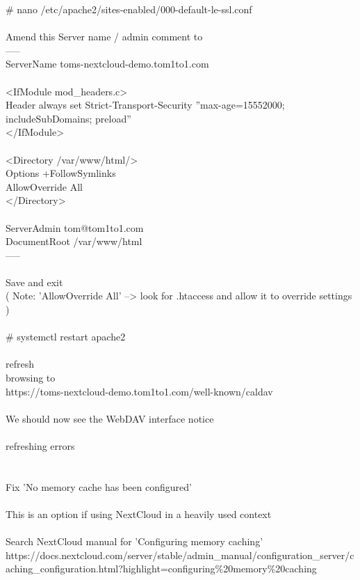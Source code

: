 \documentclass[10pt,a4paper]{article}
\begin{document}
{		\# nano /etc/apache2/sites-enabled/000-default-le-ssl.conf}{\large \\
		\\
		Amend this Server name / admin comment to\\
		-----\\
		ServerName toms-nextcloud-demo.tom1to1.com\\
\\
    		<IfModule mod\_headers.c>\\
      			Header always set Strict-Transport-Security ''max-age=15552000; includeSubDomains; preload''\\
    		</IfModule>\\
\\
		<Directory /var/www/html/>}{\large \\
				Options +FollowSymlinks\\
				AllowOverride All\\
		</Directory>\\
	\\
		ServerAdmin tom@tom1to1.com}{\large \\
		DocumentRoot /var/www/html}{\large \\
		-----\\
\\
		Save and exit\\
		( Note: 'AllowOverride All'  --> look for .htaccess and allow it to override settings )\\
		\\
		\# systemctl restart apache2\\
\\
		refresh\\
		browsing to \\
		https://toms-nextcloud-demo.tom1to1.com/well-known/caldav}{\large \\
\\
		We should now see the WebDAV interface notice\\
\\
		refreshing errors\\
\\
\\
	Fix 'No memory cache has been configured'\\
\\
			This is an option if using NextCloud in a heavily used context\\
\\
		Search NextCloud manual for 'Configuring memory caching'\\
		https://docs.nextcloud.com/server/stable/admin\_manual/configuration\_server/caching\_configuration.html?highlight=configuring\%20memory\%20caching}{\large \\
}
\end{document}
